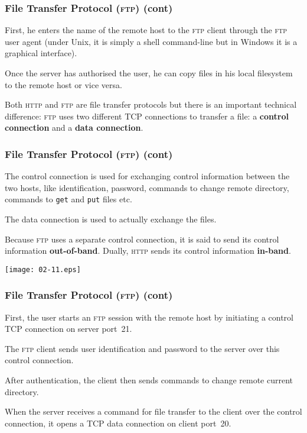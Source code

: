%
\begin{frame}
\frametitle{File Transfer Protocol (\textsc{ftp}) (cont)}

First, he enters the name of the remote host to the \textsc{ftp}
client through the \textsc{ftp} user agent (under Unix, it is simply a
shell command-line but in Windows it is a graphical interface).

Once the server has authorised the user, he can copy files in
his local filesystem to the remote host or vice versa.

Both \textsc{http} and \textsc{ftp} are file transfer protocols but
there is an important technical difference: \textsc{ftp} uses two
different TCP connections to transfer a file: a \textbf{control
  connection} and a \textbf{data connection}.

\end{frame}

%
\begin{frame}
\frametitle{File Transfer Protocol (\textsc{ftp}) (cont)}

The control connection is used for exchanging control information
between the two hosts, like identification, password, commands to
change remote directory, commands to \texttt{get} and \texttt{put}
files etc.

The data connection is used to actually exchange the files.

Because \textsc{ftp} uses a separate control connection, it is said to
send its control information \textbf{out-of-band}. Dually,
\textsc{http} sends its control information \textbf{in-band}.
\begin{center}
\texttt{[image: 02-11.eps]}
\end{center}

\end{frame}

%
\begin{frame}
\frametitle{File Transfer Protocol (\textsc{ftp}) (cont)}

First, the user starts an \textsc{ftp} session with the remote host by
initiating a control TCP connection on server port~21.

The \textsc{ftp} client sends user identification and password to the
server over this control connection.

After authentication, the client then sends commands to change remote
current directory. 

When the server receives a command for file transfer to the client
over the control connection, it opens a TCP data connection on client
port~20. 

\end{frame}

